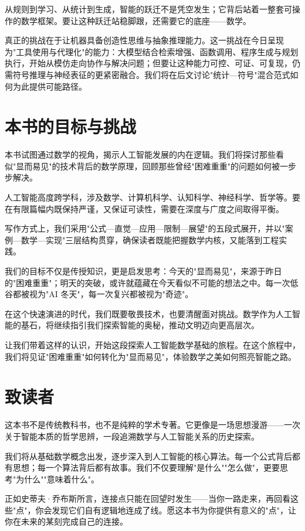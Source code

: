 从规则到学习、从统计到生成，智能的跃迁不是凭空发生；它背后站着一整套可操作的数学框架。要让这种跃迁站稳脚跟，还需要它的底座——数学。

真正的挑战在于让机器具备创造性思维与抽象推理能力。这一挑战在今日呈现为"工具使用与代理化"的能力：大模型结合检索增强、函数调用、程序生成与规划执行，开始从模仿走向协作与解决问题；但要让这种能力可控、可证、可复现，仍需符号推理与神经表征的更紧密融合。我们将在后文讨论"统计—符号"混合范式如何为此提供可能路径。

\section{本书的目标与挑战}

本书试图通过数学的视角，揭示人工智能发展的内在逻辑。我们将探讨那些看似"显而易见"的技术背后的数学原理，回顾那些曾经"困难重重"的问题如何被一步步解决。

人工智能高度跨学科，涉及数学、计算机科学、认知科学、神经科学、哲学等。要在有限篇幅内既保持严谨，又保证可读性，需要在深度与广度之间取得平衡。

写作方式上，我们采用"公式—直觉—应用—限制—展望"的五段式展开，并以"案例—数学—实现"三层结构贯穿，确保读者既能把握数学内核，又能落到工程实践。

我们的目标不仅是传授知识，更是启发思考：今天的"显而易见"，来源于昨日的"困难重重"；明天的突破，或许就蕴藏在今天看似不可能的想法之中。每一次低谷都被视为"AI 冬天"，每一次复兴都被视为"奇迹"。

在这个快速演进的时代，我们既要敬畏技术，也要清醒面对挑战。数学作为人工智能的基石，将继续指引我们探索智能的奥秘，推动文明迈向更高层次。

让我们带着这样的认识，开始这段探索人工智能数学基础的旅程。在这个旅程中，我们将见证"困难重重"如何转化为"显而易见"，体验数学之美如何照亮智能之路。

\section{致读者}

这本书不是传统教科书，也不是纯粹的学术专著。它更像是一场思想漫游——一次关于智能本质的哲学思辨，一段追溯数学与人工智能关系的历史探索。

我们将从基础数学概念出发，逐步深入到人工智能的核心算法。每一个公式背后都有思想；每一个算法背后都有故事。我们不仅要理解"是什么""怎么做"，更要思考"为什么""意味着什么"。

正如史蒂夫·乔布斯所言，连接点只能在回望时发生——当你一路走来，再回看这些"点"，你会发现它们自有逻辑地连成了线。愿这本书为你提供有意义的"点"，让你在未来的某刻完成自己的连接。

